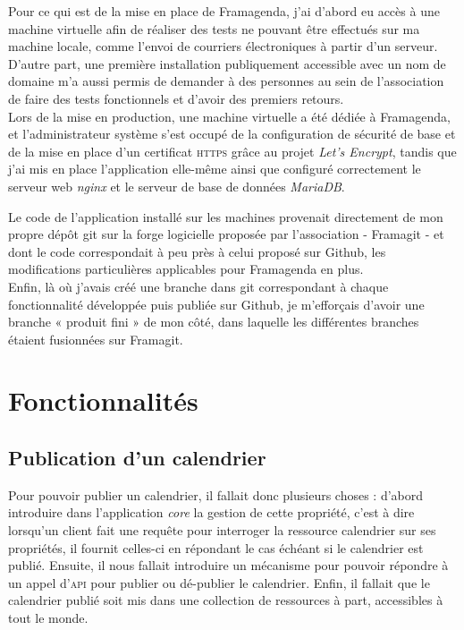 \documentclass[10pt,a4paper, twoside]{report}
\begin{document}
	Pour ce qui est de la mise en place de Framagenda, j'ai d'abord eu accès à une machine virtuelle afin de réaliser des tests ne pouvant être effectués sur ma machine locale, comme l'envoi de courriers électroniques à partir d'un serveur. D'autre part, une première installation publiquement accessible avec un nom de domaine m'a aussi permis de demander à des personnes au sein de l'association de faire des tests fonctionnels et d'avoir des premiers retours.
	\\
	
	Lors de la mise en production, une machine virtuelle a été dédiée à Framagenda, et l'administrateur système s'est occupé de la configuration de sécurité de base et de la mise en place d'un certificat \textsc{https} grâce au projet \textit{Let's Encrypt}, tandis que j'ai mis en place l'application elle-même ainsi que configuré correctement le serveur web \textit{nginx} et le serveur de base de données \textit{MariaDB}.
	
	Le code de l'application installé sur les machines provenait directement de mon propre dépôt git sur la forge logicielle proposée par l'association - Framagit - et dont le code correspondait à peu près à celui proposé sur Github, les modifications particulières applicables pour Framagenda en plus.
	\\
	
	Enfin, là où j'avais créé une branche dans git correspondant à chaque fonctionnalité développée puis publiée sur Github, je m'efforçais d'avoir une branche « produit fini » de mon côté, dans laquelle les différentes branches étaient fusionnées sur Framagit.
	
	\section{Fonctionnalités}
	\subsection{Publication d'un calendrier}
	Pour pouvoir publier un calendrier, il fallait donc plusieurs choses : d'abord introduire dans l'application \textit{core} la gestion de cette propriété, c'est à dire lorsqu'un client fait une requête pour interroger la ressource calendrier sur ses propriétés, il fournit celles-ci en répondant le cas échéant si le calendrier est publié.
	Ensuite, il nous fallait introduire un mécanisme pour pouvoir répondre à un appel d'\textsc{api} pour publier ou dé-publier le calendrier. Enfin, il fallait que le calendrier publié soit mis dans une collection de ressources à part, accessibles à tout le monde.
	
\end{document}
